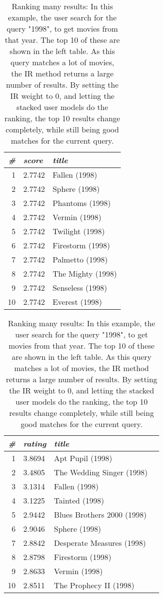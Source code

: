\begin{table}[t]
  \centering 
  \begin{minipage}{0.49\textwidth}
    \centering 

  \begin{tabular*}{\textwidth}{ r l l }
    \toprule
    \emph{\#} & \emph{score} & \emph{title}\\
    \midrule
    1 &  2.7742  &  Fallen (1998)      \\
    2 &  2.7742  &  Sphere (1998)      \\
    3 &  2.7742  &  Phantoms (1998)    \\
    4 &  2.7742  &  Vermin (1998)      \\
    5 &  2.7742  &  Twilight (1998)    \\
    6 &  2.7742  &  Firestorm (1998)   \\
    7 &  2.7742  &  Palmetto (1998)    \\
    8 &  2.7742  &  The Mighty (1998)  \\
    9 &  2.7742  &  Senseless (1998)   \\
    10&  2.7742  &  Everest (1998)     \\
    \bottomrule
  \end{tabular*}
\end{minipage} 
\hfill 
\begin{minipage}{0.49\textwidth}
  \begin{tabular*}{\textwidth}{ r l l l }
    \toprule
    \emph{\#} & \emph{rating} & \emph{title}\\
    \midrule
    1 &  3.8694  &  Apt Pupil (1998)            \\
    2 &  3.4805  &  The Wedding Singer (1998)   \\
    3 &  3.1314  &  Fallen (1998)               \\
    4 &  3.1225  &  Tainted (1998)              \\
    5 &  2.9442  &  Blues Brothers 2000 (1998)  \\
    6 &  2.9046  &  Sphere (1998)               \\
    7 &  2.8842  &  Desperate Measures (1998)   \\
    8 &  2.8798  &  Firestorm (1998)            \\
    9 &  2.8633  &  Vermin (1998)               \\
    10&  2.8511  &  The Prophecy II (1998)      \\
    \bottomrule
  \end{tabular*}
  \end{minipage} 
  \vspace{1em}
  \caption[Ranking Many Results]{
    Ranking many results: 
    In this example, the user search for the query "1998", to get movies from that year.
    The top 10 of these are shown in the left table. As this query matches a lot of 
    movies, the IR method returns a large number of results. By setting the IR weight to $0$,
    and letting the stacked user models do the ranking, the top 10 results change completely,
    while still being good matches for the current query.
  }
  \label{table:rank:year}
\end{table}



